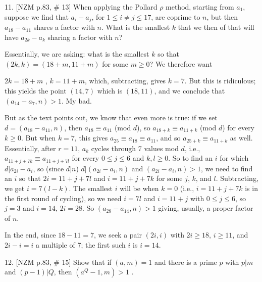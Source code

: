 \bsk

\item{11.} [NZM p.83, \# 13] When applying the Pollard $\rho$ method, starting 
from $a_1$, suppose we find that $a_i-a_j$, for $1\leq i\neq j\leq 17$, are coprime to $n$, but 
then $a_{18}-a_{11}$ shares a factor with $n$. What is the smallest $k$ that we then 
 of 
that will have $a_{2k}-a_k$ 
sharing a factor with $n$?

\msk

\item{} Essentially, we are asking: what is the smallest $k$ so that 
$(2k,k)=(18+m,11+m)$ for some $m\geq 0$? We therefore want

\ssk

\item{} $2k=18+m$ , $k=11+m$, which, subtracting, gives $k=7$.
But this is ridiculous; this yields the point $(14,7)$ 
which is  $(18,11)$, and we 
conclude that $(a_{14}-a_7,n)>1$. My bad.

\msk

\item{} But as the text points out, we know that even more is true: 
if we set $d=(a_{18}-a_{11},n)$, then $a_{18}\equiv a_{11}$ (mod $d$), so 
$a_{18+k}\equiv a_{11+k}$ (mod $d$) for every $k\geq 0$. But when $k=7$, this gives
$a_{25}\equiv a_{18}\equiv a_{11}$, and so $a_{25+k}\equiv a_{11+k}$ as well.
Essentially, after $r=11$, $a_k$ cycles through 7 values mod $d$, i.e., 
$a_{11+j+7k}\equiv a_{11+j+7l}$ for every $0\leq j\leq 6$ and $k,l\geq 0$.
So to find an $i$ for which $d|a_{2i}-a_i$, so (since $d|n$) $d|(a_{2i}-a_i,n)$
and $(a_{2i}-a_i,n)>1$, we need to find an $i$ so that
$2i=11+j+7l$ and $i=11+j+7k$ for some $j$, $k$, and $l$. Subtracting,
we get $i=7(l-k)$. The smallest $i$ will be when $k=0$ (i.e.,
$i=11+j+7k$ is in the first round of cycling), so we need $i=7l$ and
$i=11+j$ with $0\leq j\leq 6$, so $j=3$ and $i=14$, $2i=28$. So
$(a_{28}-a_{14},n)>1$ giving, usually, a proper factor of $n$.

\ssk

\item{} In the end, since $18-11=7$, we seek a pair $(2i,i)$ with $2i\geq 18$, $i\geq 11$, 
and $2i-i=i$ a multiple of 7; the first such $i$ is $i=14$.

\bsk

\item{12.} [NZM p.83, \# 15] Show that if $(a,m)=1$ and there is a prime $p$ with $p|m$ and
$(p-1)|Q$, then $(a^Q-1,m)>1$ . 

